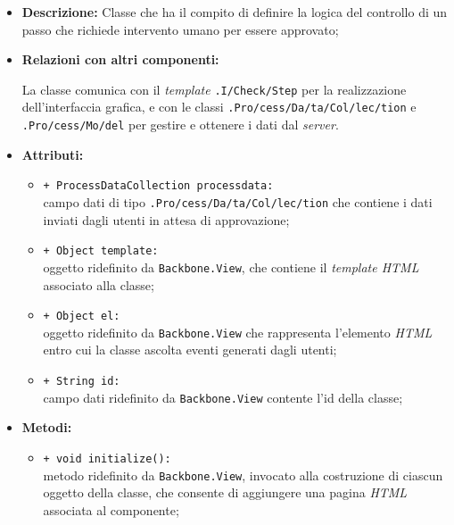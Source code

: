 \begin{flushleft}
\begin{itemize}
\item \textbf{Descrizione:} Classe che ha il compito di definire la logica del controllo di un passo che richiede intervento umano per essere approvato;
\item \textbf{Relazioni con altri componenti:}
\begin{sloppypar}
La classe comunica con il \textit{template} \texttt{\viewAdmin{}.I\fshyp{}Check\fshyp{}Step} per la realizzazione dell'interfaccia grafica, e con le classi \texttt{\collection{}.Pro\fshyp{}cess\fshyp{}Da\fshyp{}ta\fshyp{}Col\fshyp{}lec\fshyp{}tion} e \texttt{\model{}.Pro\fshyp{}cess\fshyp{}Mo\fshyp{}del} per gestire e ottenere i dati dal \textit{server}.
\end{sloppypar}
\item \textbf{Attributi:}
\begin{sloppypar}
\begin{itemize}
\item \texttt{+ ProcessDataCollection processdata:}\\ campo dati di tipo \texttt{\collection{}.Pro\fshyp{}cess\fshyp{}Da\fshyp{}ta\fshyp{}Col\fshyp{}lec\fshyp{}tion} che contiene i dati inviati dagli utenti in attesa di approvazione;
\item \texttt{+ Object template:}\\ oggetto ridefinito da \texttt{Backbone.View}, che contiene il \textit{template HTML} associato alla classe;
\item \texttt{+ Object el:}\\ oggetto ridefinito da \texttt{Backbone.View} che rappresenta l'elemento \textit{HTML} entro cui la classe ascolta eventi generati dagli utenti;
\item \texttt{+ String id:}\\ campo dati ridefinito da \texttt{Backbone.View} contente l'id della classe;
\end{itemize}
\end{sloppypar}
\item \textbf{Metodi:}
\begin{sloppypar}
\begin{itemize}
\item \texttt{+ void initialize():}\\ metodo ridefinito da \texttt{Backbone.View}, invocato alla costruzione di ciascun oggetto della classe, che consente di aggiungere una pagina \textit{HTML} associata al componente;

\end{itemize}
\end{sloppypar}
\end{itemize}
\end{flushleft}
